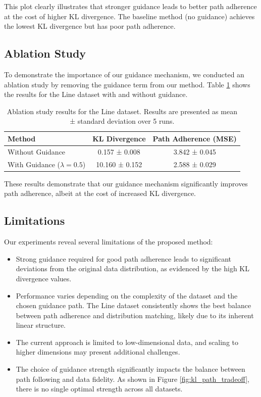 \documentclass{article} %
\begin{document}
This plot clearly illustrates that stronger guidance leads to better path adherence at the cost of higher KL divergence. The baseline method (no guidance) achieves the lowest KL divergence but has poor path adherence.

\subsection{Ablation Study}

To demonstrate the importance of our guidance mechanism, we conducted an ablation study by removing the guidance term from our method. Table \ref{tab:ablation} shows the results for the Line dataset with and without guidance.

\begin{table}[h]
    \centering
    \begin{tabular}{lcc}
        \toprule
        Method & KL Divergence & Path Adherence (MSE) \\
        \midrule
        Without Guidance & 0.157 ± 0.008 & 3.842 ± 0.045 \\
        With Guidance ($\lambda = 0.5$) & 10.160 ± 0.152 & 2.588 ± 0.029 \\
        \bottomrule
    \end{tabular}
    \caption{Ablation study results for the Line dataset. Results are presented as mean ± standard deviation over 5 runs.}
    \label{tab:ablation}
\end{table}

These results demonstrate that our guidance mechanism significantly improves path adherence, albeit at the cost of increased KL divergence.

\subsection{Limitations}

Our experiments reveal several limitations of the proposed method:

\begin{itemize}
    \item Strong guidance required for good path adherence leads to significant deviations from the original data distribution, as evidenced by the high KL divergence values.
    \item Performance varies depending on the complexity of the dataset and the chosen guidance path. The Line dataset consistently shows the best balance between path adherence and distribution matching, likely due to its inherent linear structure.
    \item The current approach is limited to low-dimensional data, and scaling to higher dimensions may present additional challenges.
    \item The choice of guidance strength significantly impacts the balance between path following and data fidelity. As shown in Figure \ref{fig:kl_path_tradeoff}, there is no single optimal strength across all datasets.
\end{itemize}
\end{document}
